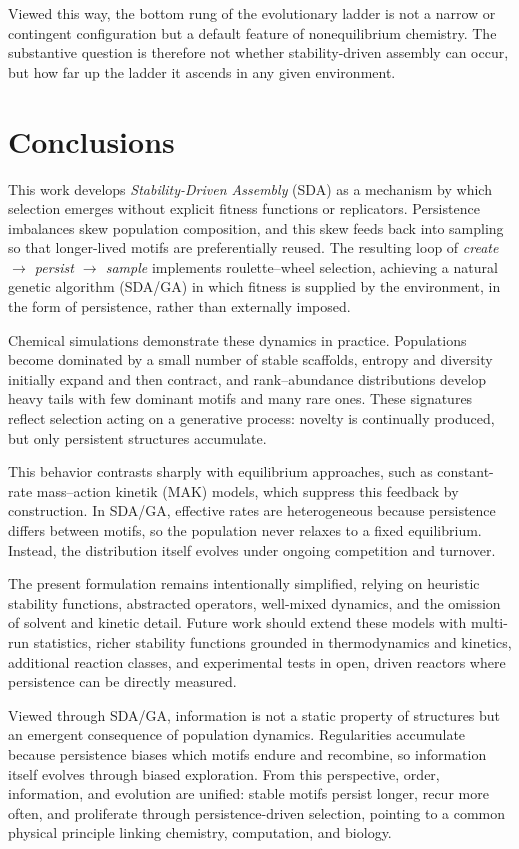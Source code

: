 \documentclass{artificial-life}
\begin{document}
Viewed this way, the bottom rung of the evolutionary ladder is not a narrow or contingent configuration but a default feature of nonequilibrium chemistry. The substantive question is therefore not whether stability-driven assembly can occur, but how far up the ladder it ascends in any given environment.

\section{Conclusions}

This work develops \textit{Stability-Driven Assembly} (SDA) as a mechanism by which selection emerges without explicit fitness functions or replicators. Persistence imbalances skew population composition, and this skew feeds back into sampling so that longer-lived motifs are preferentially reused. The resulting loop of \emph{create $\rightarrow$ persist $\rightarrow$ sample} implements roulette–wheel selection, achieving a natural genetic algorithm (SDA/GA) in which fitness is supplied by the environment, in the form of persistence, rather than externally imposed.

Chemical simulations demonstrate these dynamics in practice. Populations become dominated by a small number of stable scaffolds, entropy and diversity initially expand and then contract, and rank–abundance distributions develop heavy tails with few dominant motifs and many rare ones. These signatures reflect selection acting on a generative process: novelty is continually produced, but only persistent structures accumulate.

This behavior contrasts sharply with equilibrium approaches, such as constant-rate mass–action kinetik (MAK) models, which suppress this feedback by construction. In SDA/GA, effective rates are heterogeneous because persistence differs between motifs, so the population never relaxes to a fixed equilibrium. Instead, the distribution itself evolves under ongoing competition and turnover.

The present formulation remains intentionally simplified, relying on heuristic stability functions, abstracted operators, well-mixed dynamics, and the omission of solvent and kinetic detail. Future work should extend these models with multi-run statistics, richer stability functions grounded in thermodynamics and kinetics, additional reaction classes, and experimental tests in open, driven reactors where persistence can be directly measured.

Viewed through SDA/GA, information is not a static property of structures but an emergent consequence of population dynamics. Regularities accumulate because persistence biases which motifs endure and recombine, so information itself evolves through biased exploration. From this perspective, order, information, and evolution are unified: stable motifs persist longer, recur more often, and proliferate through persistence-driven selection, pointing to a common physical principle linking chemistry, computation, and biology.
\end{document}
